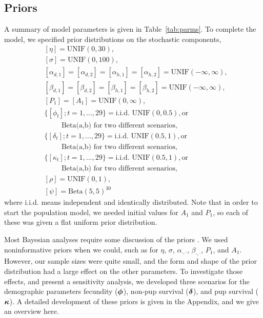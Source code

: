 \documentclass[]{risa}\usepackage[]{graphicx}\usepackage[]{color}
\def\bdelta{\mbox{\boldmath $\delta$}}
\def\bphi{\mbox{\boldmath $\phi$}}
\def\bkappa{\mbox{\boldmath $\kappa$}}
\begin{document}

\subsection{Priors} \label{sec:priors}
A summary of model parameters is given in Table~\ref{tab:parms}. To complete the model, we specified prior distributions on the stochastic components,
%
\begin{align*}
&[\eta] = \textrm{UNIF}(0,30), \\
&[\sigma] = \textrm{UNIF}(0,100), \\
&[\alpha_{d,1}] = [\alpha_{d,2}] = [\alpha_{h,1}] = [\alpha_{h,2}] = \textrm{UNIF}(-\infty,\infty), \\
&[\beta_{d,1}] = [\beta_{d,2}] = [\beta_{h,1}] = [\beta_{h,2}] = \textrm{UNIF}(-\infty,\infty), \\
&[P_1] = [A_1] = \textrm{UNIF}(0,\infty),  \\
&\{[\phi_t]; t= 1,\ldots,29\} = \textrm{i.i.d. UNIF}(0,0.5), \textrm{or} \\
& \hspace{1cm} \textrm{Beta(a,b) for two different scenarios}, \\
&\{[\delta_t]; t= 1,\ldots,29\} = \textrm{i.i.d. UNIF}(0.5,1), \textrm{or} \\
& \hspace{1cm} \textrm{Beta(a,b) for two different scenarios}, \\
&\{[\kappa_t]; t= 1,\ldots,29\} = \textrm{i.i.d. UNIF}(0.5,1), \textrm{or} \\
& \hspace{1cm} \textrm{Beta(a,b) for two different scenarios}, \\
&[\rho] = \textrm{UNIF}(0,1), \\
&[\psi] = \textrm{Beta}(5,5)^{30}
\end{align*}
where i.i.d. means independent and identically distributed. Note that in order to start the population model, we needed initial values for $A_1$ and $P_1$, so each of these was given a flat uniform prior distribution.

Most Bayesian analyses require some discussion of the priors \citep{Good:take:2010}.  We used noninformative priors when we could, such as for $\eta$, $\sigma$, $\alpha_{\cdot,\cdot}$, $\beta_{\cdot,\cdot}$, $P_1$, and $A_1$.  However, our sample sizes were quite small, and the form and shape of the prior distribution had a large effect on the other parameters.  To investigate those effects, and present a sensitivity analysis, we developed three scenarios for the demographic parameters fecundity ($\bphi$), non-pup survival ($\bdelta$), and pup survival ($\bkappa$).  A detailed development of these priors is given in the Appendix, and we give an overview here.  
\end{document}
